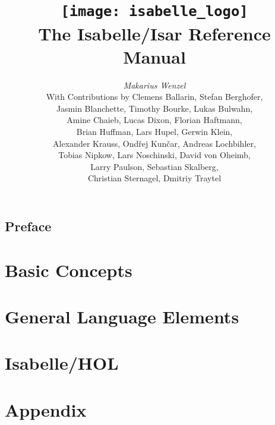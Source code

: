 \documentclass[12pt,a4paper,fleqn]{report}
\title{\texttt{[image: isabelle\_logo]} \\[4ex] The Isabelle/Isar Reference Manual}
\author{\emph{Makarius Wenzel} \\[3ex]
  With Contributions by
  Clemens Ballarin,
  Stefan Berghofer, \\
  Jasmin Blanchette,
  Timothy Bourke,
  Lukas Bulwahn, \\
  Amine Chaieb,
  Lucas Dixon,
  Florian Haftmann, \\
  Brian Huffman,
  Lars Hupel,
  Gerwin Klein, \\
  Alexander Krauss,
  Ond\v{r}ej Kun\v{c}ar,
  Andreas Lochbihler, \\
  Tobias Nipkow,
  Lars Noschinski,
  David von Oheimb, \\
  Larry Paulson,
  Sebastian Skalberg, \\
  Christian Sternagel,
  Dmitriy Traytel
}
\let\intorig=\int  %
\begin{document}
\maketitle 

\chapter*{Preface}

\tableofcontents
\listoffigures
\clearfirst

\part{Basic Concepts}



\part{General Language Elements}







\part{Isabelle/HOL}\label{part:hol}


\part{Appendix}
\appendix

\let\int\intorig


\begingroup
  \tocentry{\bibname}
   \small\raggedright\frenchspacing
  
\endgroup

\tocentry{\indexname}
\printindex
\end{document}

